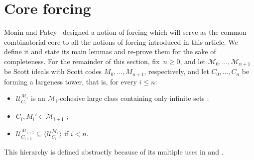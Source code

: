 \documentclass{article}
\def\U{\mathcal{U}}
\def\M{\mathcal{M}}
\numberwithin{theorem}{section}
\theoremstyle{definition}
\begin{document}

\section{Core forcing}\label{core-forcing}

Monin and Patey~\cite{monin2021weakness} designed a notion of forcing which will serve as the common combinatorial core to all the notions of forcing introduced in this article. We define it and state its main lemmas and re-prove them for the sake of completeness. 
For the remainder of this section, fix~$n \geq 0$, and let $\M_0, \dots, \M_{n+1}$ be Scott ideals with Scott codes $M_0, \dots, M_{n+1}$, respectively, and let $C_0, \dots, C_n$ be forming a largeness tower, that is, for every $i \leq n$:
\begin{itemize}
    \item $\U_{C_i}^{\M_i}$ is an $\M_i$-cohesive large class containing only infinite sets ;
    \item $C_i,M_i' \in \M_{i+1}$ ;
    \item $\U_{C_{i+1}}^{\M_{i+1}} \subseteq \langle \U_{C_i}^{\M_i} \rangle$ if $i < n$.
\end{itemize}
This hierarchy is defined abstractly because of its multiple uses in  and . 
\end{document}
